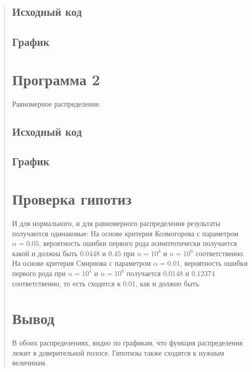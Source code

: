 \documentclass{article}
\begin{document}
\begin{quote}
\subsection{Исходный код}
        \begin{minipage}{\linewidth}
            
        \end{minipage}
\subsection{График}

\section{Программа 2}
	Равномерное распределение.
\subsection{Исходный код}
        \begin{minipage}{\linewidth}
	    
        \end{minipage}
\subsection{График}

\section{Проверка гипотиз}
  И для нормального, и для равномерного распределения результаты получаются одинаковые:
    На основе критерия Колмогорова с параметром $\alpha = 0.05$, вероятность ошибки первого рода асимптотически получается какой и должна быть $0.0448$ и $0.45$ при $n=10^4$ и $n=10^6$ соответственно.
    На основе критерия Смирнова с параметром $\alpha = 0.01$, вероятность ошибки первого рода при $n=10^4$ и $n=10^6$ получается $0.0148$ и $0.12374$ соответственно, то есть сходится к 0.01, как и должно быть.
\section{Вывод}
	В обоих распределениях, видно по графикам, что функция распределения лежит в доверительной полосе. Гипотизы также сходятся к нужным величинам.
\end{quote}
\end{document}
